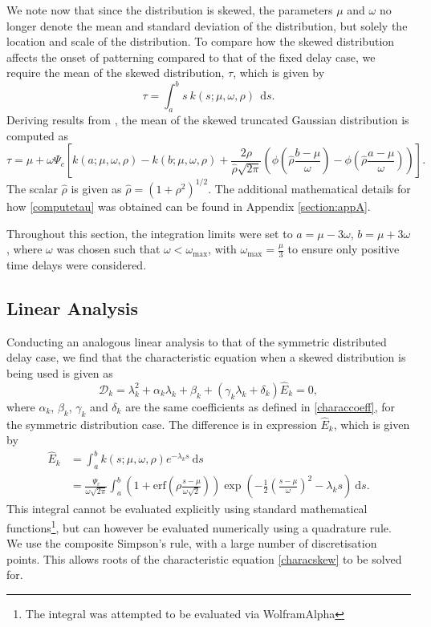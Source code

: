 We note now that since the distribution is skewed, the parameters $\mu$ and $\omega$ no longer denote the mean and standard deviation of the distribution, but solely the location and scale of the distribution. To compare how the skewed distribution affects the onset of patterning compared to that of the fixed delay case, we require the mean of the skewed distribution, $\tau$, which is given by
\begin{equation}\label{anmean}
    \tau=\int_a^bs\ k(s;\mu,\omega,\rho)\ \ \text{d}s.
\end{equation}
Deriving results from \cite{skewed}, the mean of the skewed truncated Gaussian distribution is computed as
\begin{equation}\label{computetau}
\tau=\mu+\omega\Psi_c\left[k(a;\mu,\omega,\rho)-k(b;\mu,\omega,\rho)+\frac{2\rho}{\hat{\rho}\sqrt{2\pi}}\left(\phi\left(\hat{\rho}\frac{b-\mu}{\omega}\right)-\phi\left(\hat{\rho}\frac{a-\mu}{\omega}\right)\right)\right].
\end{equation}
The scalar $\hat{\rho}$ is given as $\hat{\rho}=\left(1+\rho^2\right)^{1/2}$. The additional mathematical details for how \eqref{computetau} was obtained can be found in Appendix \ref{section:appA}.

Throughout this section, the integration limits were set to $a=\mu-3\omega$, $b=\mu+3\omega$, where $\omega$ was chosen such that $\omega<\omega_{\max}$, with $\omega_{\max}=\frac{\mu}{3}$ to ensure only positive time delays were considered.
\subsection{Linear Analysis}\label{section:linanalskew}
Conducting an analogous linear analysis to that of the symmetric distributed delay case, we find that the characteristic equation when a skewed distribution is being used is given as
\begin{equation}\label{characskew}
  \mathcal{D}_k=\lambda_k^2+\alpha_k\lambda_k+\beta_k+(\gamma_k\lambda_k+\delta_k)\hat{E}_k=0,
\end{equation}
where $\alpha_k$, $\beta_k$, $\gamma_k$ and $\delta_k$ are the same coefficients as defined in \eqref{characcoeff}, for the symmetric distribution case. The difference is in expression $\hat{E}_k$, which is given by
\begin{equation}\label{Ehat}
    \begin{split}
\hat{E}_k&=\int_a^bk(s;\mu,\omega,\rho)e^{-\lambda_k s}\ \text{d}s\\
&=\frac{\Psi_c}{\omega\sqrt{2\pi}}\int_a^b\left(1+\text{erf}\left(\rho\frac{s-\mu}{\omega\sqrt{2}}\right)\right)\exp\left(-\frac{1}{2}\left(\frac{s-\mu}{\omega}\right)^2-\lambda_ks\right)\ \text{d}s.
    \end{split}
\end{equation}
This integral cannot be evaluated explicitly using standard mathematical functions\footnote{The integral was attempted to be evaluated via WolframAlpha}, but can however be evaluated numerically using a quadrature rule. We use the composite Simpson's rule, with a large number of discretisation points. This allows roots of the characteristic equation \eqref{characskew} to be solved for.

